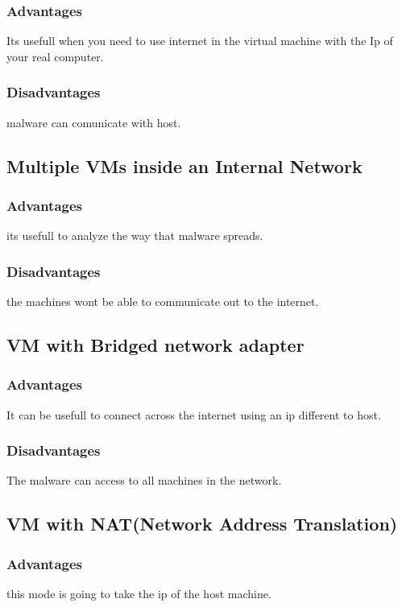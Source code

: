 \documentclass[10pt,a4paper]{article} %
\begin{document}
            \subsubsection{Advantages}
                Its usefull when you need to use internet in the virtual
                machine with the Ip of your real computer.
            \subsubsection{Disadvantages}
                malware can comunicate with host.

        \subsection{Multiple VMs inside an Internal Network}
            \subsubsection{Advantages}
                its usefull to analyze the way that malware spreads.
            \subsubsection{Disadvantages}
                the machines wont be able to communicate out to the internet.

        \subsection{VM with Bridged network adapter}
            \subsubsection{Advantages}
                It can be usefull to connect across the internet using an ip
                different to host.
            \subsubsection{Disadvantages}
                The malware can access to all machines in the network.

        \subsection{VM with NAT(Network Address Translation)}
            \subsubsection{Advantages}
               this mode is going to take the ip of the host machine.
\end{document}
